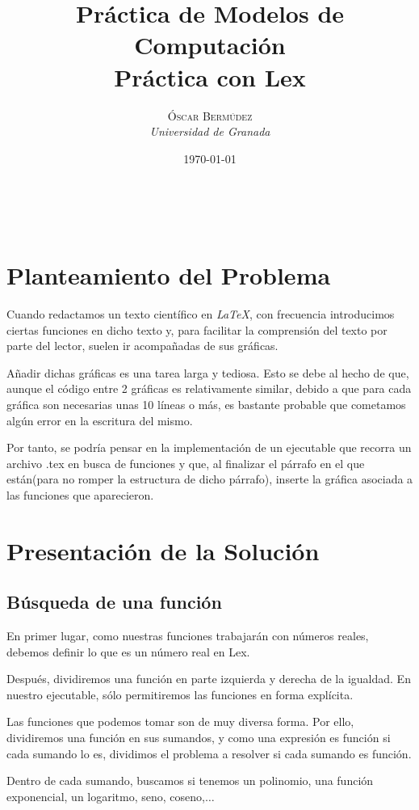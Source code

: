 \documentclass[a4paper, 11pt]{article} %
\title{\textbf{Práctica de Modelos de Computación}\\ %
Práctica con Lex} %
\author{\textsc{Óscar Bermúdez} %
\\{\textit{Universidad de Granada}}} %
\date{\today} %
\makeatletter
\renewcommand{\maketitle}{ %
\begin{center}
{\LARGE\@title} %
\end{center}

\vspace{30pt} %

\begin{flushright} %
{\large\@author} %
\\\@date %

\vspace{20pt} %
\end{flushright}
}
\makeatother
\begin{document}
\maketitle %

\tableofcontents

\newpage

\section{Planteamiento del Problema}
	Cuando redactamos un texto científico en \textit{LaTeX}, con frecuencia introducimos ciertas funciones en dicho texto y, para facilitar la comprensión del texto por parte del lector, suelen ir acompañadas de sus gráficas.
	
	Añadir dichas gráficas es una tarea larga y tediosa. Esto se debe al hecho de que, aunque el código entre 2 gráficas es relativamente similar, debido a que para cada gráfica son necesarias unas 10 líneas o más, es bastante probable que cometamos algún error en la escritura del mismo.
	
	Por tanto, se podría pensar en la implementación de un ejecutable que recorra un archivo .tex en busca de funciones y que, al finalizar el párrafo en el que están(para no romper la estructura de dicho párrafo), inserte la gráfica asociada a las funciones que aparecieron.

\section{Presentación de la Solución}
	\subsection{Búsqueda de una función}
		En primer lugar, como nuestras funciones trabajarán con números reales, debemos definir lo que es un número real en Lex.
		
		Después, dividiremos una función en parte izquierda y derecha de la igualdad. En nuestro ejecutable, sólo permitiremos las funciones en forma explícita.
		
		Las funciones que podemos tomar son de muy diversa forma. Por ello, dividiremos una función en sus sumandos, y como una expresión es función si cada sumando lo es, dividimos el problema a resolver si cada sumando es función.
		
		Dentro de cada sumando, buscamos si tenemos un polinomio, una función exponencial, un logaritmo, seno, coseno,$\dots$
		
\end{document}
